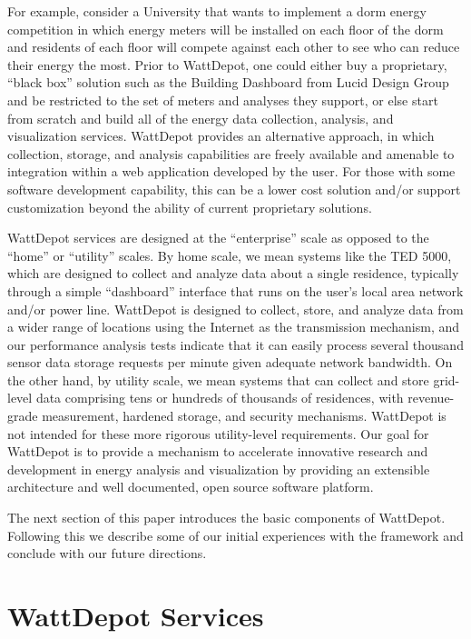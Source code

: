 \documentclass[conference,compsoc]{IEEEtran}
\begin{document}
For example, consider a University that wants to implement a dorm energy
competition in which energy meters will be installed on each floor of the
dorm and residents of each floor will compete against each other to see who
can reduce their energy the most.  Prior to WattDepot, one could either buy a
proprietary, ``black box'' solution such as the Building Dashboard from
Lucid Design Group and be restricted to the set of meters and analyses they
support, or else start from scratch and build all of the energy data
collection, analysis, and visualization services.  WattDepot provides an
alternative approach, in which collection, storage, and analysis
capabilities are freely available and amenable to integration within a web
application developed by the user.  For those with some software
development capability, this can be a lower cost solution and/or support
customization beyond the ability of current proprietary solutions.

WattDepot services are designed at the ``enterprise'' scale as opposed to
the ``home'' or ``utility'' scales.  By home scale, we mean systems like
the TED 5000, which are designed to collect and analyze data about a single
residence, typically through a simple ``dashboard'' interface that runs on
the user's local area network and/or power line.  WattDepot is designed to
collect, store, and analyze data from a wider range of locations using the
Internet as the transmission mechanism, and our performance analysis tests
indicate that it can easily process several thousand sensor data storage
requests per minute given adequate network bandwidth.  On the other hand,
by utility scale, we mean systems that can collect and store grid-level
data comprising tens or hundreds of thousands of residences, with
revenue-grade measurement, hardened storage, and security mechanisms.
WattDepot is not intended for these more rigorous utility-level
requirements.  Our goal for WattDepot is to provide a mechanism to
accelerate innovative research and development in energy analysis and
visualization by providing an extensible architecture and well documented,
open source software platform.

The next section of this paper introduces the basic components of
WattDepot. Following this we describe some of our initial experiences with
the framework and conclude with our future directions. 

\section{WattDepot Services}
\end{document}
